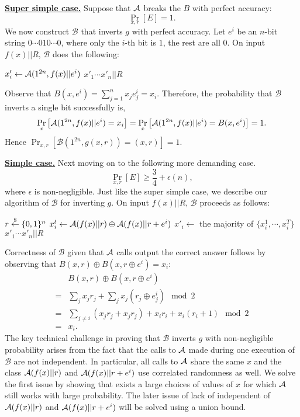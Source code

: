 \medskip
\noindent\textbf{\underline{Super simple case.}}
Suppose that $\mathcal{A}$ breaks the $B$ with perfect accuracy:
$$\Pr_{x,r}[E] =1.$$
We  now construct $\mathcal{B}$ that inverts $g$ with perfect accuracy.
Let $e^i$ be an $n$-bit string $0\cdots 0 1 0 \cdots0$, where only the $i$-th bit is $1$, the rest are all $0$.
On input $f(x)||R$, $\mathcal{B}$ does the following:

\medskip
\begin{algorithmic}
    \State $x'_i \gets \mathcal{A}(1^{2n}, f(x)||e^i)$
\EndFor
\State \Return $x'_1\cdots x'_n || R$
\end{algorithmic}
Observe that $B(x,e^i) = \sum_{j=1}^n x_je^i_j = x_i$. Therefore, the probability that $\mathcal{B}$ inverts a single bit successfully is,
$$\Pr_{x}\left[\mathcal{A}(1^{2n}, f(x)||e^i)=x_i\right] =  \Pr_{x}\left[\mathcal{A}(1^{2n}, f(x)||e^i)=B(x,e^i)\right] = 1.$$
Hence $\Pr_{x,r}[\mathcal{B}(1^{2n}, g(x,r)) = (x,r)] = 1$.


\bigskip
\noindent\textbf{\underline{Simple case.}}
Next moving on to the following more demanding case.
$$\Pr_{x,r}[E] \geq \frac{3}{4} + \epsilon(n),$$
 where $\epsilon$ is non-negligible.
Just like the super simple case, we describe our algorithm of $\mathcal{B}$ for inverting $g$.
On input $f(x)||R$, $\mathcal{B}$ proceeds as follows:

\medskip
\begin{algorithmic}
		\State $r \stackrel{\$}{\leftarrow} \{0,1\}^{n}$
    	\State $x_i^t \leftarrow \mathcal{A}(f(x)|| r) \oplus \mathcal{A}(f(x) || r+e^i)$
	\EndFor
	\State $x'_i \gets $ the majority of $\{x_i^1, \cdots, x_i^T\}$
\EndFor
\State \Return $x'_1\cdots x'_n||R$
\end{algorithmic}
Correctness of $\mathcal{B}$ given that $\mathcal{A}$ calls output the correct answer follows by observing that $B(x,r) \oplus B(x, r\oplus e^i) = x_i$:
\begin{align*}
&B(x,r) \oplus B(x, r\oplus e^i)\\
=& \sum_j x_j r_j + \sum_j x_j (r_j \oplus e^i_j) \mod 2\\
=& \sum_{j \not= i} (x_j r_j + x_j r_j) + x_i r_i + x_i (r_i+1) \mod 2\\
=& x_i.
\end{align*}
The key technical challenge in proving that $\mathcal{B}$ inverts $g$ with non-negligible probability arises from the fact that the calls to $\mathcal{A}$ made during one execution of $\mathcal{B}$ are not independent. In particular, all calls to $\mathcal{A}$ share the same $x$ and the class $\mathcal{A}(f(x)|| r)$ and $\mathcal{A}(f(x) || r+e^i)$ use correlated randomness as well. We solve the first issue by showing that exists a large choices of values of $x$ for which $\mathcal{A}$ still works with large probability. The later issue of lack of independent of $\mathcal{A}(f(x)|| r)$ and $\mathcal{A}(f(x) || r+e^i)$ will be solved using a union bound.

